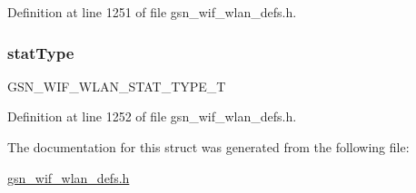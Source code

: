 Definition at line 1251 of file gsn\_\-wif\_\-wlan\_\-defs.h.

\hypertarget{a00406_ace1deff0d018b5cea37667c8eaed18ed}{
\subsubsection[{statType}]{ {\bf statType}}}
\label{a00406_ace1deff0d018b5cea37667c8eaed18ed}
GSN\_\-WIF\_\-WLAN\_\-STAT\_\-TYPE\_\-T 

Definition at line 1252 of file gsn\_\-wif\_\-wlan\_\-defs.h.



The documentation for this struct was generated from the following file:\begin{DoxyCompactItemize}
\item 
\hyperlink{a00613}{gsn\_\-wif\_\-wlan\_\-defs.h}\end{DoxyCompactItemize}

